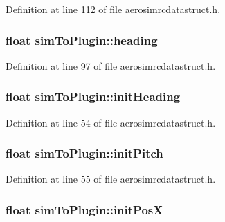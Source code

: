 \-Definition at line 112 of file aerosimrcdatastruct.\-h.

\hypertarget{group___aero_sim_r_c_ga62f831b287508b68a2b0ad45a9d2dc18}{
\subsubsection[{heading}]{\setlength{\rightskip}{0pt plus 5cm}float {\bf sim\-To\-Plugin\-::heading}}}\label{group___aero_sim_r_c_ga62f831b287508b68a2b0ad45a9d2dc18}


\-Definition at line 97 of file aerosimrcdatastruct.\-h.

\hypertarget{group___aero_sim_r_c_gaab0124b4fd93c132aacdb2cb2a755770}{
\subsubsection[{init\-Heading}]{\setlength{\rightskip}{0pt plus 5cm}float {\bf sim\-To\-Plugin\-::init\-Heading}}}\label{group___aero_sim_r_c_gaab0124b4fd93c132aacdb2cb2a755770}


\-Definition at line 54 of file aerosimrcdatastruct.\-h.

\hypertarget{group___aero_sim_r_c_gacc022659d5c4b32c0a878bdc6eea0f53}{
\subsubsection[{init\-Pitch}]{\setlength{\rightskip}{0pt plus 5cm}float {\bf sim\-To\-Plugin\-::init\-Pitch}}}\label{group___aero_sim_r_c_gacc022659d5c4b32c0a878bdc6eea0f53}


\-Definition at line 55 of file aerosimrcdatastruct.\-h.

\hypertarget{group___aero_sim_r_c_ga23ae6e8ef17ad84cc500793e730df894}{
\subsubsection[{init\-Pos\-X}]{\setlength{\rightskip}{0pt plus 5cm}float {\bf sim\-To\-Plugin\-::init\-Pos\-X}}}\label{group___aero_sim_r_c_ga23ae6e8ef17ad84cc500793e730df894}


